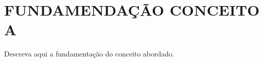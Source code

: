 \section{FUNDAMENDAÇÃO CONCEITO A}
\label{sec:fundamentacao_a}

Descreva aqui a fundamentação do conceito abordado.